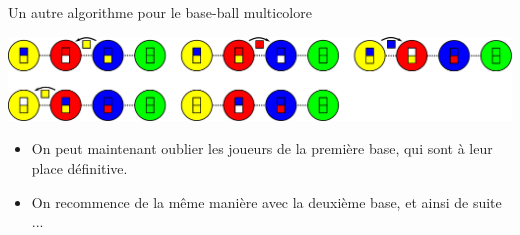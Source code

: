 \begin{frame}{Un autre algorithme pour le base-ball multicolore}
  \begin{center}
    \includegraphics[width=0.8\linewidth]{img/baseball_ex3.pdf}
  \end{center}

  \begin{itemize}
  \item On peut maintenant oublier les joueurs de la première base, qui sont à leur place définitive.
  \item On recommence de la même manière avec la deuxième base, et ainsi de suite ...
  \end{itemize}
\end{frame}

